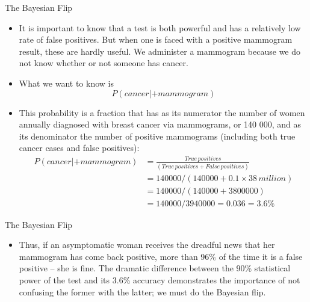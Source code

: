 \documentclass[10pt,handout]{beamer}\usepackage[]{graphicx}\usepackage[]{color}
\begin{document}
\begin{frame}{The Bayesian Flip}
	
	\begin{itemize}
		\item It is important to know that
		a test is both powerful and has a relatively low
		rate of false positives. But when one is faced
		with a positive mammogram result, these are
		hardly useful. We administer a mammogram
		because we do not know whether or not
		someone has cancer.
		\item What we want to know is
$$P(cancer | +mammogram)$$ \pause 
		\item This probability is a fraction
that has as its numerator the number of
		women annually diagnosed with breast
cancer via mammograms, or 140 000, and
as its denominator the number of positive
		mammograms (including both true cancer
cases and false positives):
		\begin{align*}
		P(cancer | +mammogram) &= \frac{True\, positives}{(True\,positives + False\, positives)} \\
		&= 140 000 / (140 000 + 0.1 × 38\,million)
\\
		&= 140 000 / (140 000 + 3 800 000)
\\
		&= 140 000 / 3 940 000 = 0.036 = 3.6\%
		\end{align*}
	\end{itemize}
	
\end{frame}


\begin{frame}{The Bayesian Flip}
\begin{itemize}
	\item Thus, if an asymptomatic woman receives
	the dreadful news that her mammogram
	has come back positive, more than 96\% of
	the time it is a false positive – she is fine.
	The dramatic difference between the 90\%
	statistical power of the test and its 3.6\%
	accuracy demonstrates the importance of not
	confusing the former with the latter; we must
	do the Bayesian flip.
\end{itemize}

\end{frame}
\end{document}
